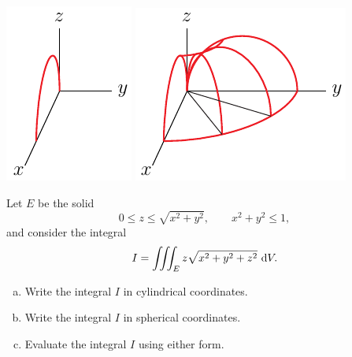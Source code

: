 \begin{solution}
\begin{center}
     \includegraphics{fig/torusA.pdf}\qquad
     \includegraphics{fig/torusB.pdf}
\end{center}
\end{solution}

\begin{question}[M200 2014A] %
Let $E$ be the solid
\begin{equation*}
0 \le z \le \sqrt{x^2 + y^2},\qquad
x^2 + y^2 \le 1,
\end{equation*}
and consider the integral
\begin{equation*}
I = \iiint_E z \sqrt{x^2 + y^2 + z^2}\  \mathrm{d}V.
\end{equation*}
\begin{enumerate}[(a)]
\item
Write the integral $I$ in cylindrical coordinates.

\item
Write the integral $I$ in spherical coordinates.

\item
Evaluate the integral $I$ using either form.
\end{enumerate}
\end{question}

%

